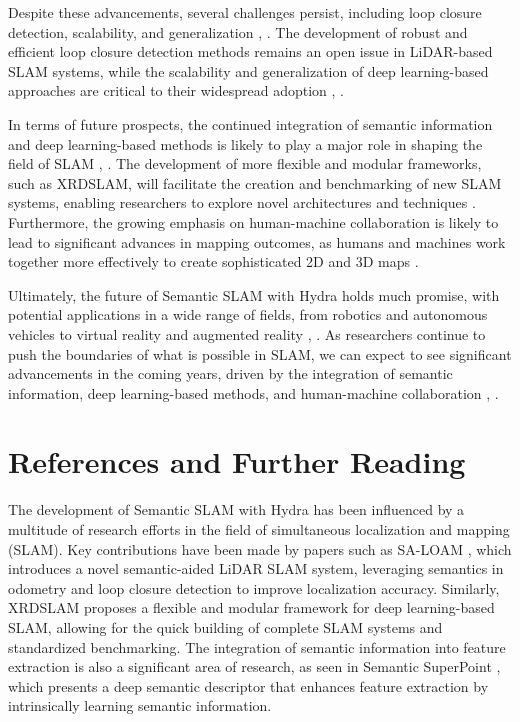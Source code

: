 \documentclass[conference]{IEEEtran}
\begin{document}
Despite these advancements, several challenges persist, including loop closure detection, scalability, and generalization \cite{b2}, \cite{b4}. The development of robust and efficient loop closure detection methods remains an open issue in LiDAR-based SLAM systems, while the scalability and generalization of deep learning-based approaches are critical to their widespread adoption \cite{b2}, \cite{b4}.

In terms of future prospects, the continued integration of semantic information and deep learning-based methods is likely to play a major role in shaping the field of SLAM \cite{b1}, \cite{b3}. The development of more flexible and modular frameworks, such as XRDSLAM, will facilitate the creation and benchmarking of new SLAM systems, enabling researchers to explore novel architectures and techniques \cite{b4}. Furthermore, the growing emphasis on human-machine collaboration is likely to lead to significant advances in mapping outcomes, as humans and machines work together more effectively to create sophisticated 2D and 3D maps \cite{b1}.

Ultimately, the future of Semantic SLAM with Hydra holds much promise, with potential applications in a wide range of fields, from robotics and autonomous vehicles to virtual reality and augmented reality \cite{b1}, \cite{b3}. As researchers continue to push the boundaries of what is possible in SLAM, we can expect to see significant advancements in the coming years, driven by the integration of semantic information, deep learning-based methods, and human-machine collaboration \cite{b1}, \cite{b4}.

\section{References and Further Reading}
The development of Semantic SLAM with Hydra has been influenced by a multitude of research efforts in the field of simultaneous localization and mapping (SLAM). Key contributions have been made by papers such as SA-LOAM \cite{b1}, which introduces a novel semantic-aided LiDAR SLAM system, leveraging semantics in odometry and loop closure detection to improve localization accuracy. Similarly, XRDSLAM \cite{b2} proposes a flexible and modular framework for deep learning-based SLAM, allowing for the quick building of complete SLAM systems and standardized benchmarking. The integration of semantic information into feature extraction is also a significant area of research, as seen in Semantic SuperPoint \cite{b3}, which presents a deep semantic descriptor that enhances feature extraction by intrinsically learning semantic information.
\end{document}
